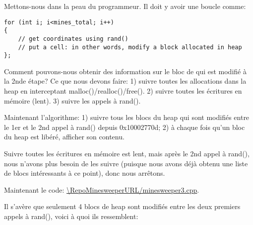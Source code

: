Mettons-nous dans la peau du programmeur.
Il doit y avoir une boucle comme:

\begin{lstlisting}
for (int i; i<mines_total; i++)
{
	// get coordinates using rand()
	// put a cell: in other words, modify a block allocated in heap
};
\end{lstlisting}

Comment pouvons-nous obtenir des information sur le bloc de qui est modifié à la
2nde étape?
Ce que nous devons faire:
1) suivre toutes les allocations dans la heap en interceptant malloc()/realloc()/free().
2) suivre toutes les écritures en mémoire (lent).
3) suivre les appels à rand().

Maintenant l'algorithme:
1) suivre tous les blocs du heap qui sont modifiés entre le 1er et le 2nd appel à
rand() depuis 0x10002770d;
2) à chaque fois qu'un bloc du heap est libéré, afficher son contenu.

Suivre toutes les écritures en mémoire est lent, mais après le 2nd appel à rand(),
nous n'avons plus besoin de les suivre (puisque nous avons déjà obtenu une liste
de blocs intéressants à ce point), donc nous arrêtons.

Maintenant le code: \url{\RepoMinesweeperURL/minesweeper3.cpp}.

Il s'avère que seulement 4 blocs de heap sont modifiés entre les deux premiers appels
à rand(), voici à quoi ils ressemblent:


